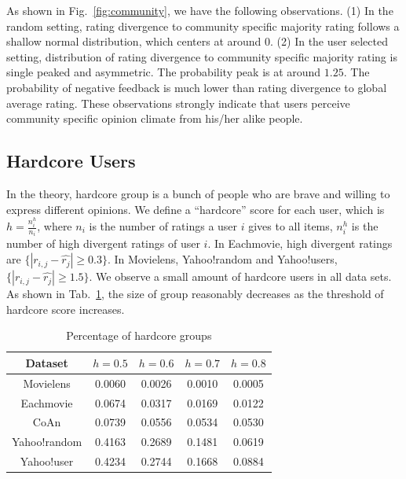 \documentclass[sigconf]{acmart}
\begin{document}
As shown in Fig.~\ref{fig:community}, we have the following observations. (1) In the random setting, rating divergence to community specific majority rating follows a shallow normal distribution, which centers at around $0$.  (2) In the user selected setting, distribution of rating divergence to community specific majority rating is single peaked and asymmetric. The probability peak is at around $1.25$. The probability of negative feedback is much lower than rating divergence to global average rating. These observations strongly indicate that users perceive community specific opinion climate from his/her alike people.

\subsection{Hardcore Users}

In the theory, hardcore group is a bunch of people who are brave and willing to express different opinions. We define a ``hardcore'' score for each user, which is $h=\frac{n^h_i}{n_i}$, where $n_i$ is the number of ratings a user $i$ gives to all items, $n^h_i$ is the number of high divergent ratings of user $i$. In Eachmovie, high divergent ratings are $\{|r_{i,j}-\hat{r_{j}}|\geq 0.3\}$. In Movielens, Yahoo!random and Yahoo!users, $\{|r_{i,j}-\hat{r_{j}}|\geq 1.5\}$. We observe a small amount of hardcore users in all data sets. As shown in Tab.~\ref{tab:hardcore}, the size of group reasonably decreases as the threshold of hardcore score increases.

\begin{table}[htbp]
\centering
\caption{Percentage of hardcore groups}\label{tab:hardcore}
\centering
\begin{tabular}{|c|c|c|c|c|}
\hline
Dataset & $h=0.5$ & $h=0.6$ & $h=0.7$ & $h=0.8$ \\\hline\hline
Movielens & 0.0060	 & 0.0026 &	0.0010 &	0.0005 \\\hline
Eachmovie & 0.0674 &	0.0317 &	0.0169 &	0.0122\\\hline
CoAn & 0.0739 &	0.0556 &	0.0534 &	0.0530\\\hline
Yahoo!random & 0.4163& 0.2689& 0.1481& 0.0619\\\hline
Yahoo!user & 0.4234 &0.2744 & 0.1668 & 0.0884\\\hline
\end{tabular}
\end{table}
\end{document}
